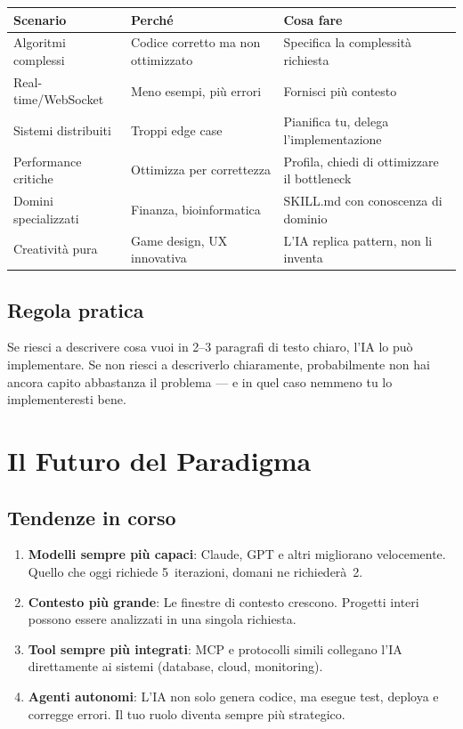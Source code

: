 \begin{center}
\begin{small}
\begin{tabularx}{\textwidth}{l X X}
\toprule
\textbf{Scenario} & \textbf{Perché} & \textbf{Cosa fare} \\
\midrule
Algoritmi complessi & Codice corretto ma non ottimizzato & Specifica la complessità richiesta \\
Real-time/WebSocket & Meno esempi, più errori & Fornisci più contesto \\
Sistemi distribuiti & Troppi edge case & Pianifica tu, delega l'implementazione \\
Performance critiche & Ottimizza per correttezza & Profila, chiedi di ottimizzare il bottleneck \\
Domini specializzati & Finanza, bioinformatica & SKILL.md con conoscenza di dominio \\
Creatività pura & Game design, UX innovativa & L'IA replica pattern, non li inventa \\
\bottomrule
\end{tabularx}
\end{small}
\end{center}

\subsection{Regola pratica}

\begin{notebox}
Se riesci a descrivere cosa vuoi in 2--3 paragrafi di testo chiaro, l'IA lo può implementare. Se non riesci a descriverlo chiaramente, probabilmente non hai ancora capito abbastanza il problema --- e in quel caso nemmeno tu lo implementeresti bene.
\end{notebox}

\section{Il Futuro del Paradigma}

\subsection{Tendenze in corso}

\begin{enumerate}
  \item \textbf{Modelli sempre più capaci}: Claude, GPT e altri migliorano velocemente. Quello che oggi richiede 5~iterazioni, domani ne richiederà~2.
  \item \textbf{Contesto più grande}: Le finestre di contesto crescono. Progetti interi possono essere analizzati in una singola richiesta.
  \item \textbf{Tool sempre più integrati}: MCP e protocolli simili collegano l'IA direttamente ai sistemi (database, cloud, monitoring).
  \item \textbf{Agenti autonomi}: L'IA non solo genera codice, ma esegue test, deploya e corregge errori. Il tuo ruolo diventa sempre più strategico.
\end{enumerate}

